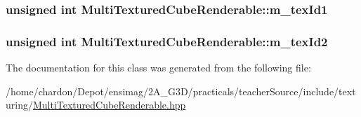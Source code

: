 \hypertarget{classMultiTexturedCubeRenderable_ac00c241a06009cd3650bc09658209394}{
\subsubsection[{m\+\_\+tex\+Id1}]{\setlength{\rightskip}{0pt plus 5cm}unsigned int Multi\+Textured\+Cube\+Renderable\+::m\+\_\+tex\+Id1\hspace{0.3cm}{\ttfamily [private]}}}\label{classMultiTexturedCubeRenderable_ac00c241a06009cd3650bc09658209394}
\hypertarget{classMultiTexturedCubeRenderable_a84eb4a8f43e2eed94101b563c61aae0c}{
\subsubsection[{m\+\_\+tex\+Id2}]{\setlength{\rightskip}{0pt plus 5cm}unsigned int Multi\+Textured\+Cube\+Renderable\+::m\+\_\+tex\+Id2\hspace{0.3cm}{\ttfamily [private]}}}\label{classMultiTexturedCubeRenderable_a84eb4a8f43e2eed94101b563c61aae0c}


The documentation for this class was generated from the following file\+:\begin{DoxyCompactItemize}
\item 
/home/chardon/\+Depot/ensimag/2\+A\+\_\+\+G3\+D/practicals/teacher\+Source/include/texturing/\hyperlink{MultiTexturedCubeRenderable_8hpp}{Multi\+Textured\+Cube\+Renderable.\+hpp}\end{DoxyCompactItemize}
